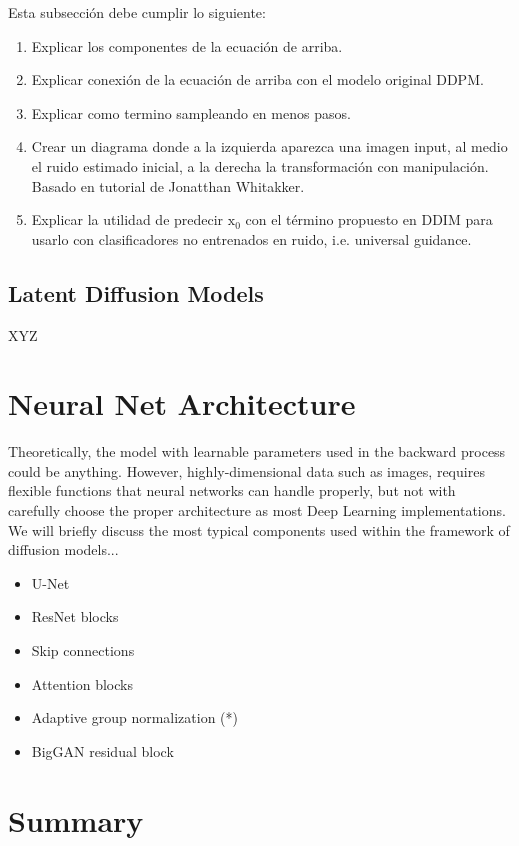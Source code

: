 Esta subsección debe cumplir lo siguiente:

\begin{enumerate}
    \item Explicar los componentes de la ecuación de arriba.
    \item Explicar conexión de la ecuación de arriba con el modelo original DDPM.
    \item Explicar como termino sampleando en menos pasos.
    \item Crear un diagrama donde a la izquierda aparezca una imagen input, al medio el ruido estimado inicial, a la derecha la transformación con
manipulación. Basado en tutorial de Jonatthan Whitakker.
    \item Explicar la utilidad de predecir $\mathrm{x}_{0}$ con el término
    propuesto en DDIM para usarlo con clasificadores no entrenados en ruido, i.e. universal guidance.
\end{enumerate}


\subsection{Latent Diffusion Models}

XYZ

\section{Neural Net Architecture}

Theoretically, the model with learnable parameters used in the backward process could be anything. However, highly-dimensional data such as images, requires flexible functions that neural networks can handle properly, but not with carefully choose the proper architecture as most Deep Learning implementations. We will briefly discuss the most typical components used within the framework of diffusion models...\\

\begin{itemize}
    \item U-Net
    \item ResNet blocks
    \item Skip connections
    \item Attention blocks
    \item Adaptive group normalization (*)
    \item BigGAN residual block
\end{itemize}


\section{Summary}

